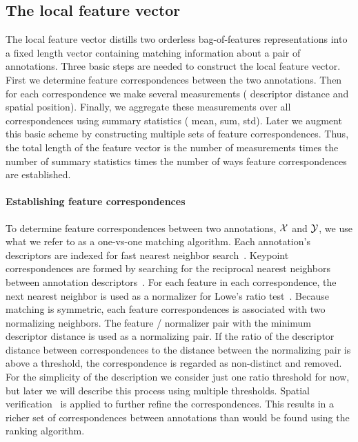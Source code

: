 \subsection{The local feature vector}
The local feature vector distills two orderless bag-of-features representations into a fixed length vector
  containing matching information about a pair of annotations.
Three basic steps are needed to construct the local feature vector.
First we determine feature correspondences between the two annotations.
Then for each correspondence we make several measurements (\eg{} descriptor distance and spatial position).
Finally, we aggregate these measurements over all correspondences using summary statistics (\eg{} mean, sum,
  std).
Later we augment this basic scheme by constructing multiple sets of feature correspondences.
Thus, the total length of the feature vector is the number of measurements times the number of summary statistics
  times the number of ways feature correspondences are established.


\paragraph{Establishing feature correspondences}
To determine feature correspondences between two annotations, $\mathcal{X}$ and $\mathcal{Y}$, we use what we refer to as a
  one-vs-one matching algorithm.
Each annotation's descriptors are indexed for fast nearest neighbor search~\cite{muja_fast_2009}.
Keypoint correspondences are formed by searching for the reciprocal nearest neighbors between annotation
  descriptors~\cite{qin_hello_2011}.
For each feature in each correspondence, the next nearest neighbor is used as a normalizer for Lowe's ratio
  test~\cite{lowe_distinctive_2004}.
Because matching is symmetric, each feature correspondences is associated with two normalizing neighbors.
The feature / normalizer pair with the minimum descriptor distance is used as a normalizing pair.
If the ratio of the descriptor distance between correspondences to the distance between the normalizing pair is
  above a threshold, the correspondence is regarded as non-distinct and removed.
For the simplicity of the description we consider just one ratio threshold for now, but later we will describe
  this process using multiple thresholds.
Spatial verification~\cite{philbin_object_2007} is applied to further refine the correspondences.
This results in a richer set of correspondences between annotations than would be found using
  the ranking algorithm.


